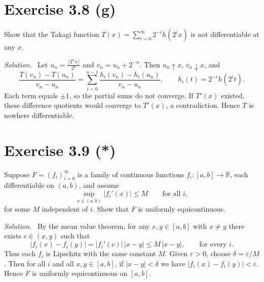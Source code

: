 \documentclass[11pt,a4paper]{article}
\newenvironment{solution}{\par\noindent\textit{Solution.}\ }{\par\vspace{0.5em}}
\begin{document}
\section*{Exercise 3.8 (g)}
Show that the Takagi function $T(x)=\sum_{i=0}^{\infty}2^{-i}h(2^i x)$ is not differentiable at any $x$.

\begin{solution}
Let $u_n=\frac{\lfloor 2^n x\rfloor}{2^n}$ and $v_n=u_n+2^{-n}$. Then $u_n\uparrow x$, $v_n\downarrow x$, and
\[
\frac{T(v_n)-T(u_n)}{v_n-u_n}=\sum_{i=0}^{n-1}\frac{h_i(v_n)-h_i(u_n)}{v_n-u_n},\qquad h_i(t)=2^{-i}h(2^i t).
\]
Each term equals $\pm1$, so the partial sums do not converge. If $T'(x)$ existed, these difference quotients
would converge to $T'(x)$, a contradiction. Hence $T$ is nowhere differentiable.
\end{solution}

\section*{Exercise 3.9 (*)}
Suppose $F=(f_i)_{i=0}^\infty$ is a family of continuous functions $f_i:[a,b]\to\mathbb{R}$,
each differentiable on $(a,b)$, and assume
\[
\sup_{x\in(a,b)}|f_i'(x)|\le M\qquad\text{for all }i,
\]
for some $M$ independent of $i$. Show that $F$ is uniformly equicontinuous.

\begin{solution}
By the mean value theorem, for any $x,y\in[a,b]$ with $x\ne y$ there exists $c\in(x,y)$ such that
\[
|f_i(x)-f_i(y)|=|f_i'(c)|\,|x-y|\le M\,|x-y|,\qquad\text{for every }i.
\]
Thus each $f_i$ is Lipschitz with the same constant $M$. Given $\varepsilon>0$, choose $\delta=\varepsilon/M$.
Then for all $i$ and all $x,y\in[a,b]$, if $|x-y|<\delta$ we have $|f_i(x)-f_i(y)|<\varepsilon$.
Hence $F$ is uniformly equicontinuous on $[a,b]$.
\end{solution}
\end{document}

